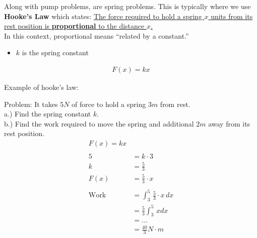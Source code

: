 Along with pump problems, are spring problems. This is typically where we 
use \textbf{Hooke's Law} which states: 
\noindent \underline{The force required to hold a 
spring $x$ units from its rest position is \textbf{proportional} to the distance
$x$.}\\

\noindent In this context, proportional means ``related by a constant.''

\begin{framed}
  \begin{itemize} 
    \item $k$ is the spring constant
  \end{itemize} 
\begin{align*}
  F(x) = kx
\end{align*}
\end{framed}

\noindent Example of hooke's law:

\begin{framed}
    \noindent Problem: It takes $5N$ of force to hold a spring $3m$ from rest.\\
    a.) Find the spring constant $k$.\\
    b.) Find the work required to move the spring and additional $2m$ away from
        its rest position.
\begin{align*}
  F(x) = kx\\\\
  5 &= k \cdot 3\\
  k &= \frac{5}{3}\\
  F(x) &= \frac{5}{3} \cdot x\\\\
  \text{Work} &= \int_3^5 \, \frac{5}{3} \cdot x \, dx\\
  &= \frac{5}{3} \int_3^5 \, x dx\\
  &= . . .\\
  &= \frac{40}{3} N \cdot m
\end{align*}
\end{framed}